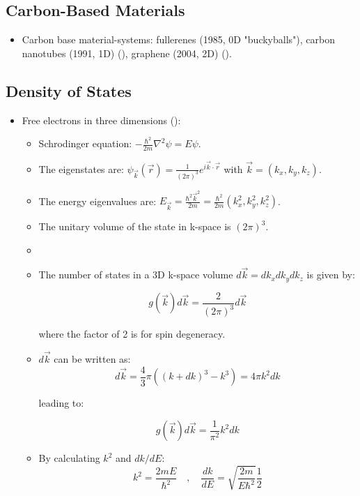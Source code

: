 \subsection{Carbon-Based Materials}

\begin{itemize}
    \item Carbon base material-systems: fullerenes (1985, 0D "buckyballs"), carbon nanotubes (1991, 1D) (), graphene (2004, 2D) ().
\end{itemize}

\subsection{Density of States}

\begin{itemize}
    \item Free electrons in three dimensions ():

          \begin{itemize}
              \item Schrodinger equation: $-\frac{\hbar^2}{2m}\nabla^2\psi = E\psi$.
              \item The eigenstates are: $\psi_{\vec{k}}(\vec{r}) = \frac{1}{(2 \pi)^3} e^{i \vec{k} \cdot \vec{r}}$ with $\vec{k} = (k_x, k_y, k_z)$.
              \item The energy eigenvalues are: $E_{\vec{k}} = \frac{\hbar^2 \vec{k}^2}{2m} = \frac{\hbar^2}{2m}(k_x^2, k_y^2, k_z^2)$.
              \item The unitary volume of the state in k-space is $(2\pi)^3$.
              \item \item The number of states in a 3D k-space volume $d \vec{k} = dk_x dk_y dk_z$ is given by:

                    \[ g(\vec{k}) d\vec{k} = \frac{2}{(2\pi)^3} d\vec{k} \]

                    where the factor of 2 is for spin degeneracy.

              \item $d\vec{k}$ can be written as:
                    \[ d\vec{k} = \frac{4}{3} \pi ((k+dk)^3 - k^3) = 4 \pi k^2 dk \]

                    leading to:

                    \[ g(\vec{k}) d\vec{k} = \frac{1}{\pi^2} k^2 dk \]

              \item By calculating $k^2$ and $dk/dE$:
                    \[ k^2 = \frac{2mE}{\hbar^2} \quad , \quad \frac{dk}{dE} = \sqrt{\frac{2m}{E \hbar^2}} \frac{1}{2}\]


\end{itemize}
\end{itemize}
